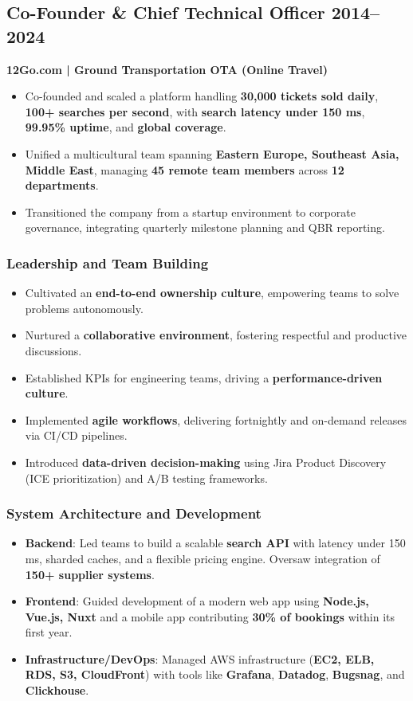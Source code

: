\documentclass[11pt,a4paper]{article}
\begin{document}
\subsection*{Co-Founder \& Chief Technical Officer \hfill 2014--2024}
\textbf{12Go.com | Ground Transportation OTA (Online Travel)}
\begin{itemize}
    \item Co-founded and scaled a platform handling \textbf{30,000 tickets sold daily}, \textbf{100+ searches per second}, with \textbf{search latency under 150 ms}, \textbf{99.95\% uptime}, and \textbf{global coverage}.
    \item Unified a multicultural team spanning \textbf{Eastern Europe, Southeast Asia, Middle East}, managing \textbf{45 remote team members} across \textbf{12 departments}.
    \item Transitioned the company from a startup environment to corporate governance, integrating quarterly milestone planning and QBR reporting.
\end{itemize}

\subsubsection*{Leadership and Team Building}
\begin{itemize}
    \item Cultivated an \textbf{end-to-end ownership culture}, empowering teams to solve problems autonomously.
    \item Nurtured a \textbf{collaborative environment}, fostering respectful and productive discussions.
    \item Established KPIs for engineering teams, driving a \textbf{performance-driven culture}.
    \item Implemented \textbf{agile workflows}, delivering fortnightly and on-demand releases via CI/CD pipelines.
    \item Introduced \textbf{data-driven decision-making} using Jira Product Discovery (ICE prioritization) and A/B testing frameworks.
\end{itemize}

\subsubsection*{System Architecture and Development}
\begin{itemize}
    \item \textbf{Backend}: Led teams to build a scalable \textbf{search API} with latency under 150 ms, sharded caches, and a flexible pricing engine. Oversaw integration of \textbf{150+ supplier systems}.
    \item \textbf{Frontend}: Guided development of a modern web app using \textbf{Node.js, Vue.js, Nuxt} and a mobile app contributing \textbf{30\% of bookings} within its first year.
    \item \textbf{Infrastructure/DevOps}: Managed AWS infrastructure (\textbf{EC2, ELB, RDS, S3, CloudFront}) with tools like \textbf{Grafana}, \textbf{Datadog}, \textbf{Bugsnag}, and \textbf{Clickhouse}.
\end{itemize}
\end{document}
